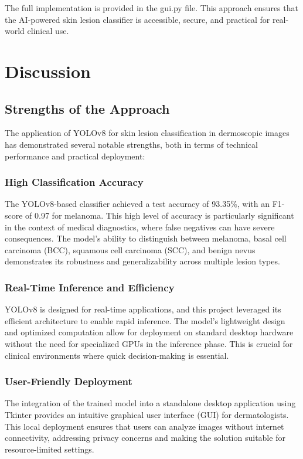 \documentclass[a4paper,12pt]{report}
\begin{document}
\begin{spacing}{1.5}
    The full implementation is provided in the gui.py file. This approach ensures that the AI-powered skin lesion classifier is accessible, secure, and practical for real-world clinical use.
    
\chapter{Discussion}

    \section{Strengths of the Approach}
    
    The application of YOLOv8 for skin lesion classification in dermoscopic images has demonstrated several notable strengths, both in terms of technical performance and practical deployment:
    
        \subsection*{High Classification Accuracy}
        The YOLOv8-based classifier achieved a test accuracy of 93.35\%, with an F1-score of 0.97 for melanoma. This high level of accuracy is particularly significant in the context of medical diagnostics, where false negatives can have severe consequences. The model’s ability to distinguish between melanoma, basal cell carcinoma (BCC), squamous cell carcinoma (SCC), and benign nevus demonstrates its robustness and generalizability across multiple lesion types.
        
        \subsection*{Real-Time Inference and Efficiency}
        YOLOv8 is designed for real-time applications, and this project leveraged its efficient architecture to enable rapid inference. The model’s lightweight design and optimized computation allow for deployment on standard desktop hardware without the need for specialized GPUs in the inference phase. This is crucial for clinical environments where quick decision-making is essential.
        
        \subsection*{User-Friendly Deployment}
        The integration of the trained model into a standalone desktop application using Tkinter provides an intuitive graphical user interface (GUI) for dermatologists. This local deployment ensures that users can analyze images without internet connectivity, addressing privacy concerns and making the solution suitable for resource-limited settings.
        

\end{spacing}
\end{document}
